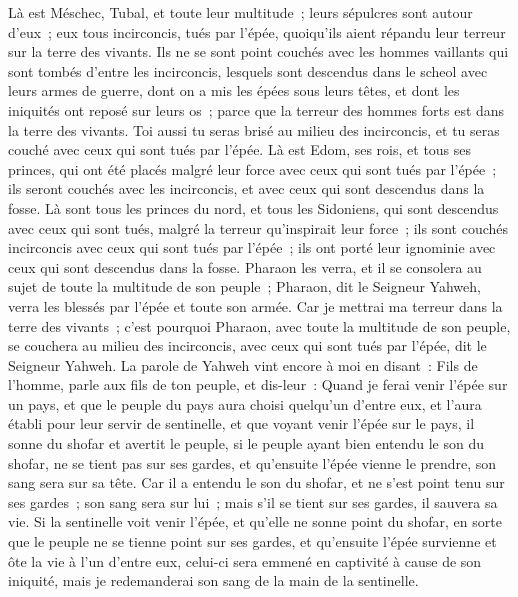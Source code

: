 \begin{multicols}{2}
Là est Méschec, Tubal, et toute leur multitude~; leurs sépulcres sont autour d'eux~; eux tous incirconcis, tués par l'épée, quoiqu'ils aient répandu leur terreur sur la terre des vivants.
Ils ne se sont point couchés avec les hommes vaillants qui sont tombés d'entre les incirconcis, lesquels sont descendus dans le scheol avec leurs armes de guerre, dont on a mis les épées sous leurs têtes, et dont les iniquités ont reposé sur leurs os~; parce que la terreur des hommes forts est dans la terre des vivants.
Toi aussi tu seras brisé au milieu des incirconcis, et tu seras couché avec ceux qui sont tués par l'épée.
Là est Edom, ses rois, et tous ses princes, qui ont été placés malgré leur force avec ceux qui sont tués par l'épée~; ils seront couchés avec les incirconcis, et avec ceux qui sont descendus dans la fosse.
Là sont tous les princes du nord, et tous les Sidoniens, qui sont descendus avec ceux qui sont tués, malgré la terreur qu'inspirait leur force~; ils sont couchés incirconcis avec ceux qui sont tués par l'épée~; ils ont porté leur ignominie avec ceux qui sont descendus dans la fosse.
Pharaon les verra, et il se consolera au sujet de toute la multitude de son peuple~; Pharaon, dit le Seigneur Yahweh, verra les blessés par l'épée et toute son armée.
Car je mettrai ma terreur dans la terre des vivants~; c'est pourquoi Pharaon, avec toute la multitude de son peuple, se couchera au milieu des incirconcis, avec ceux qui sont tués par l'épée, dit le Seigneur Yahweh.
\VerseOne{}La parole de Yahweh vint encore à moi en disant~:
Fils de l'homme, parle aux fils de ton peuple, et dis-leur~: Quand je ferai venir l'épée sur un pays, et que le peuple du pays aura choisi quelqu'un d'entre eux, et l'aura établi pour leur servir de sentinelle,
et que voyant venir l'épée sur le pays, il sonne du shofar et avertit le peuple,
si le peuple ayant bien entendu le son du shofar, ne se tient pas sur ses gardes, et qu'ensuite l'épée vienne le prendre, son sang sera sur sa tête.
Car il a entendu le son du shofar, et ne s'est point tenu sur ses gardes~; son sang sera sur lui~; mais s'il se tient sur ses gardes, il sauvera sa vie.
Si la sentinelle voit venir l'épée, et qu'elle ne sonne point du shofar, en sorte que le peuple ne se tienne point sur ses gardes, et qu'ensuite l'épée survienne et ôte la vie à l'un d'entre eux, celui-ci sera emmené en captivité à cause de son iniquité, mais je redemanderai son sang de la main de la sentinelle.

\end{multicols}
